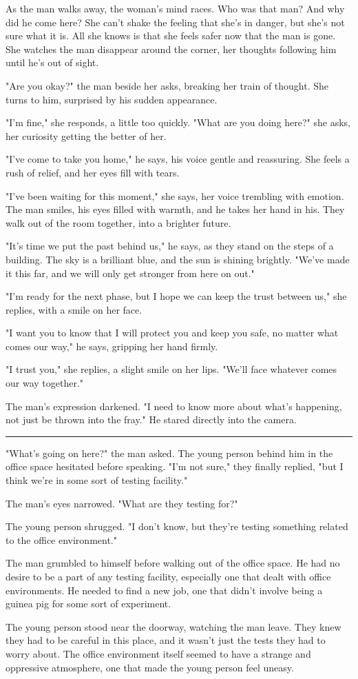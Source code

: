 \documentclass[smalldemyvopaper,11pt,twoside,onecolumn,openright,extrafontsizes]{memoir}
\begin{document}
As the man walks away, the woman's mind races. Who was that man? And why did he come here? She can't shake the feeling that she's in danger, but she's not sure what it is. All she knows is that she feels safer now that the man is gone. She watches the man disappear around the corner, her thoughts following him until he's out of sight.\par
"Are you okay?" the man beside her asks, breaking her train of thought. She turns to him, surprised by his sudden appearance.\par
"I'm fine," she responds, a little too quickly. "What are you doing here?" she asks, her curiosity getting the better of her.\par
"I've come to take you home," he says, his voice gentle and reassuring. She feels a rush of relief, and her eyes fill with tears.\par
"I've been waiting for this moment," she says, her voice trembling with emotion. The man smiles, his eyes filled with warmth, and he takes her hand in his. They walk out of the room together, into a brighter future.\par
"It's time we put the past behind us," he says, as they stand on the steps of a building. The sky is a brilliant blue, and the sun is shining brightly. "We've made it this far, and we will only get stronger from here on out."\par
"I'm ready for the next phase, but I hope we can keep the trust between us," she replies, with a smile on her face.\par
"I want you to know that I will protect you and keep you safe, no matter what comes our way," he says, gripping her hand firmly.\par
"I trust you," she replies, a slight smile on her lips. "We'll face whatever comes our way together."\par
The man's expression darkened. "I need to know more about what's happening, not just be thrown into the fray." He stared directly into the camera.\par
\fancybreak{* * *}
"What's going on here?" the man asked. The young person behind him in the office space hesitated before speaking. "I'm not sure," they finally replied, "but I think we're in some sort of testing facility."\par
The man's eyes narrowed. "What are they testing for?"\par
The young person shrugged. "I don't know, but they're testing something related to the office environment."\par
The man grumbled to himself before walking out of the office space. He had no desire to be a part of any testing facility, especially one that dealt with office environments. He needed to find a new job, one that didn't involve being a guinea pig for some sort of experiment.\par
The young person stood near the doorway, watching the man leave. They knew they had to be careful in this place, and it wasn't just the tests they had to worry about. The office environment itself seemed to have a strange and oppressive atmosphere, one that made the young person feel uneasy.\par
\end{document}
